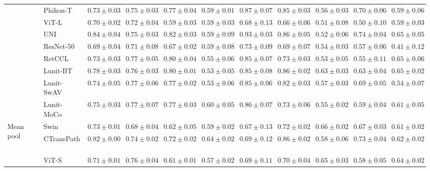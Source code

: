 \begin{tabular}{ll|cccc|c|cccc}
 & Phikon-T~\cite{filiot2023scaling} & $0.73 \pm 0.03$ & $0.75 \pm 0.03$ & $0.77 \pm 0.04$ & $0.59 \pm 0.01$ & $0.87 \pm 0.07$ & $0.85 \pm 0.03$ & $0.56 \pm 0.03$ & $0.70 \pm 0.06$ & $0.59 \pm 0.06$ \\
 & ViT-L~\cite{kolesnikov2021image} & $0.70 \pm 0.02$ & $0.72 \pm 0.04$ & $0.59 \pm 0.03$ & $0.59 \pm 0.03$ & $0.68 \pm 0.13$ & $0.66 \pm 0.06$ & $0.51 \pm 0.08$ & $0.50 \pm 0.10$ & $0.59 \pm 0.03$ \\
 & UNI~\cite{chen2024uni} & $\mathbf{0.84 \pm 0.04}$ & $0.75 \pm 0.03$ & $\mathbf{0.82 \pm 0.03}$ & $0.59 \pm 0.09$ & $\mathbf{0.93 \pm 0.03}$ & $0.86 \pm 0.05$ & $0.52 \pm 0.06$ & $0.74 \pm 0.04$ & $0.65 \pm 0.05$ \\
 & ResNet-50~\cite{he2015deep} & $0.69 \pm 0.04$ & $0.71 \pm 0.08$ & $0.67 \pm 0.02$ & $0.59 \pm 0.08$ & $0.73 \pm 0.09$ & $0.69 \pm 0.07$ & $0.54 \pm 0.03$ & $0.57 \pm 0.06$ & $0.41 \pm 0.12$ \\
 & RetCCL~\cite{wang2023retccl} & $0.73 \pm 0.03$ & $0.77 \pm 0.05$ & $0.80 \pm 0.04$ & $0.55 \pm 0.06$ & $0.85 \pm 0.07$ & $0.73 \pm 0.03$ & $0.53 \pm 0.05$ & $0.55 \pm 0.11$ & $0.65 \pm 0.06$ \\
 & Lunit-BT~\cite{kang2023benchmarking} & $0.78 \pm 0.03$ & $0.76 \pm 0.03$ & $0.80 \pm 0.01$ & $0.53 \pm 0.05$ & $0.85 \pm 0.08$ & $0.86 \pm 0.02$ & $\mathbf{0.63 \pm 0.03}$ & $0.63 \pm 0.04$ & $0.65 \pm 0.02$ \\
 & Lunit-SwAV~\cite{kang2023benchmarking} & $0.74 \pm 0.05$ & $0.77 \pm 0.06$ & $0.77 \pm 0.02$ & $0.53 \pm 0.06$ & $0.85 \pm 0.06$ & $0.82 \pm 0.03$ & $0.57 \pm 0.03$ & $0.69 \pm 0.05$ & $0.54 \pm 0.07$ \\
 & Lunit-MoCo~\cite{kang2023benchmarking} & $0.75 \pm 0.03$ & $0.77 \pm 0.07$ & $0.77 \pm 0.03$ & $0.60 \pm 0.05$ & $0.86 \pm 0.07$ & $0.73 \pm 0.06$ & $0.55 \pm 0.02$ & $0.59 \pm 0.04$ & $0.61 \pm 0.05$ \\
\cline{1-11}
\multirow[t]{14}{*}{Mean pool} & Swin~\cite{liu2021swin} & $0.73 \pm 0.01$ & $0.68 \pm 0.04$ & $0.62 \pm 0.05$ & $0.59 \pm 0.02$ & $0.67 \pm 0.13$ & $0.72 \pm 0.02$ & $\mathbf{0.66 \pm 0.02}$ & $0.67 \pm 0.03$ & $0.61 \pm 0.02$ \\
 & CTransPath~\cite{wang2022transformer} & $0.82 \pm 0.00$ & $0.74 \pm 0.02$ & $0.72 \pm 0.02$ & $\mathbf{0.64 \pm 0.02}$ & $0.69 \pm 0.12$ & $0.86 \pm 0.02$ & $0.58 \pm 0.06$ & $0.73 \pm 0.04$ & $0.62 \pm 0.02$ \\
 & ViT-S~\cite{kolesnikov2021image} & $0.71 \pm 0.01$ & $0.76 \pm 0.04$ & $0.61 \pm 0.01$ & $0.57 \pm 0.02$ & $0.69 \pm 0.11$ & $0.70 \pm 0.04$ & $0.65 \pm 0.03$ & $0.58 \pm 0.05$ & $0.64 \pm 0.02$ \\

\end{tabular}
